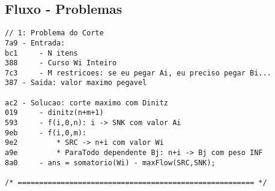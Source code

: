 \documentclass[11pt, a4paper, twoside]{article}
\begin{document}
\subsection{Fluxo - Problemas}
\begin{lstlisting}
// 1: Problema do Corte
7a9 - Entrada:
bc1 	- N itens
388 	- Curso Wi Inteiro
7c3 	- M restricoes: se eu pegar Ai, eu preciso pegar Bi...
387 - Saida: valor maximo pegavel

ac2 - Solucao: corte maximo com Dinitz
019 	- dinitz(n+m+1)
593 	- f(i,0,n): i -> SNK com valor Ai
9eb 	- f(i,0,m):
9e2 		* SRC -> n+i com valor Wi
a9e 		* ParaTodo dependente Bj: n+i -> Bj com peso INF
8a0 	- ans = somatorio(Wi) - maxFlow(SRC,SNK);

/* ======================================================= */
\end{lstlisting}
\end{document}
